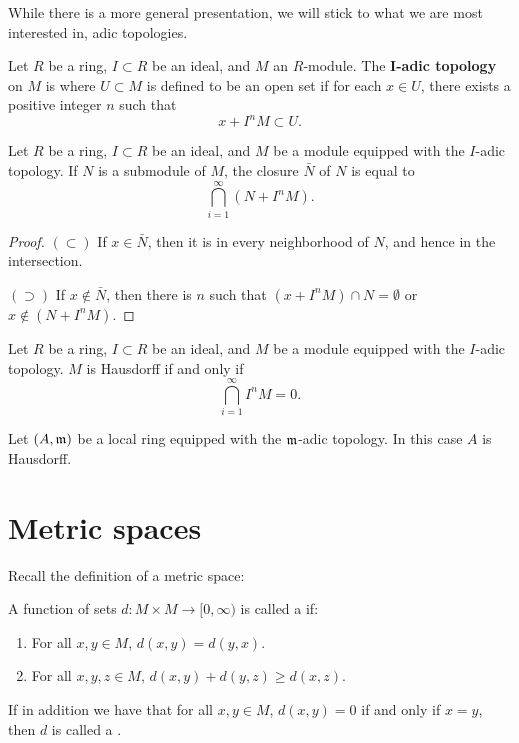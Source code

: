 \documentclass{ximera}
\begin{document}
While there is a more general presentation, we will stick to what we
are most interested in, adic topologies.


\begin{definition}
  Let $R$ be a ring, $I \subset R$ be an ideal, and $M$ an
  $R$-module. The \textbf{$\boldsymbol{I}$-adic topology} on $M$ is
  where $U \subset M$ is defined to be an open set if for each $x\in
  U$, there exists a positive integer $n$ such that
  \[
  x + I^n M \subset U.
  \]
\end{definition}



\begin{proposition}
  Let $R$ be a ring, $I\subset R$ be an ideal, and $M$ be a module
  equipped with the $I$-adic topology. If $N$ is a submodule of $M$,
  the closure $\bar{N}$ of $N$ is equal to
  \[
  \bigcap_{i=1}^\infty (N+I^n M).
  \]
  \begin{proof}
    $(\subset)$ If $x\in \bar{N}$, then it is in every
    neighborhood of $N$, and hence in the intersection.

    $(\supset)$ If $x\notin\bar{N}$, then there is $n$ such that
    $(x+I^nM)\cap N=\emptyset$ or $x\notin (N+I^nM)$.
  \end{proof}
\end{proposition}

\begin{corollary}
  Let $R$ be a ring, $I\subset R$ be an ideal, and $M$ be a module
  equipped with the $I$-adic topology. $M$ is Hausdorff if and only if
  \[
  \bigcap_{i=1}^\infty I^n M  = 0.
  \]
\end{corollary}

\begin{corollary}
  Let $(A,\mathfrak{m})$ be a local ring equipped with the $\mathfrak{m}$-adic
  topology. In this case $A$ is Hausdorff.
\end{corollary}





\section{Metric spaces}


Recall the definition of a metric space:

\begin{definition}
  A function of sets $d:M\times M\to [0,\infty)$ is called a  if:
    \begin{enumerate}
    \item For all $x,y\in M$, $d(x,y) = d(y,x)$.
    \item For all $x,y,z\in M$, $d(x,y) + d(y,z) \ge d(x,z)$.
    \end{enumerate}
    If in addition we have that for all $x,y \in M$, $d(x,y)=0$ if and
    only if $x = y$, then $d$ is called a .
\end{definition}
\end{document}
